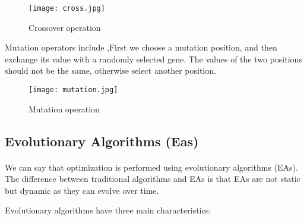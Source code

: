 \documentclass[a4paper,12pt]{report}
\begin{document}
{{			\begin{figure}[h]
			\begin{center}
				\texttt{[image: cross.jpg]}\\
			\end{center}
			\caption{ Crossover operation}
		\end{figure}
		
		
\par		Mutation operators include ,First we choose a mutation position, and then exchange its value with a randomly selected gene. The values of the two positions should not be the same, otherwise select another position.
		
		
			\begin{figure}[h]
			\begin{center}
				\texttt{[image: mutation.jpg]}\\
			\end{center}
			\caption{ Mutation operation}
		\end{figure}
	

	
	
	\pagebreak
	
			
			
		\subsection{Evolutionary Algorithms (Eas)}
		\paragraph{}
		{
			
			\linespread{1.5}
			We can say that optimization is performed using evolutionary algorithms (EAs). The difference between traditional algorithms and EAs is that EAs are not static but dynamic as they can evolve over time.
			
			
			
			
			
			Evolutionary algorithms have three main characteristics:
			\begin{itemize}
				

\end{itemize}}}}
\end{document}
